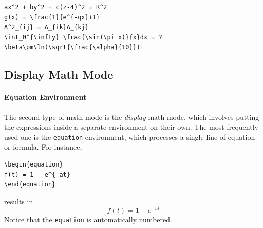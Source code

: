 %
\begin{Answer}
\begin{lstlisting}
ax^2 + by^2 + c(z-4)^2 = R^2
g(x) = \frac{1}{e^{-qx}+1}
A^2_{ij} = A_{ik}A_{kj}
\int_0^{\infty} \frac{\sin(\pi x)}{x}dx = ?
\beta\pm\ln(\sqrt{\frac{\alpha}{10}})i
\end{lstlisting}
\end{Answer}

\subsection{Display Math Mode}

\paragraph{Equation Environment}
The second type of math mode is the \textit{display} math mode, which involves putting the expressions inside a separate environment on their own. The most frequently used one is the \texttt{equation} environment, which processes a single line of equation or formula. For instance,
\begin{lstlisting}
\begin{equation}
f(t) = 1 - e^{-at}
\end{equation}
\end{lstlisting}
results in
\begin{equation}
f(t) = 1 - e^{-at}
\end{equation}
Notice that the \texttt{equation} is automatically numbered.

